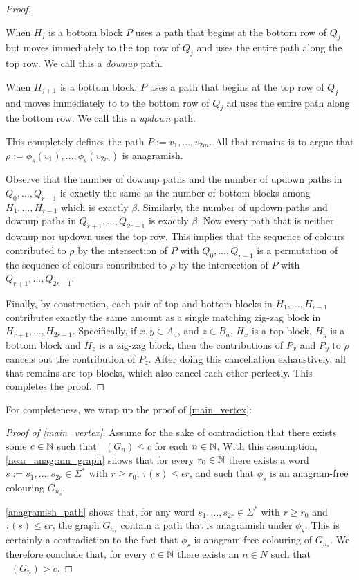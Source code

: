 \documentclass{patmorin}
\DeclareMathOperator{\afcn}{\dot{\chi}_\pi}
\begin{document}
\begin{proof}
    \begin{compactenum}
        \item When $H_j$ is a bottom block $P$ uses a path that begins at the bottom row of $Q_j$ but moves immediately to the top row of $Q_j$ and uses the entire path along the top row. We call this a \emph{downup} path.
        \item When $H_{j+1}$ is a bottom block, $P$ uses a path that begins at the top row of $Q_j$ and moves immediately to to the bottom row of $Q_j$ ad uses the entire path along the bottom row.  We call this a \emph{updown} path.
    \end{compactenum}
    This completely defines the path $P:=v_1,\ldots,v_{2m}$. All that remains is to argue that $\rho:=\phi_s(v_1),\ldots,\phi_s(v_{2m})$ is anagramish.

    Observe that the number of downup paths and the number of updown paths in $Q_0,\ldots,Q_{r-1}$ is exactly the same as the number of bottom blocks among $H_1,\ldots,H_{r-1}$ which is exactly $\beta$.  Similarly, the number of updown paths and downup paths in $Q_{r+1},\ldots,Q_{2r-1}$ is exactly $\beta$.  Now every path that is neither downup nor updown uses the top row.  This implies that the sequence of colours contributed to $\rho$ by  the intersection of $P$ with $Q_0,\ldots,Q_{r-1}$ is a permutation of the sequence of colours contributed to $\rho$ by the intersection of $P$ with $Q_{r+1},\ldots,Q_{2r-1}$.

    Finally, by construction, each pair of top and bottom blocks in $H_1,\ldots,H_{r-1}$ contributes exactly the same amount as a single matching zig-zag block in $H_{r+1},\ldots,H_{2r-1}$.  Specifically, if $x,y\in A_a$, and $z\in B_a$, $H_x$ is a top block, $H_y$ is a bottom block and $H_z$ is a zig-zag block, then the contributions of $P_x$ and $P_y$ to $\rho$ cancels out the contribution of $P_z$. After doing this cancellation exhaustively, all that remains are top blocks, which also cancel each other perfectly.  This completes the proof.
\end{proof}


For completeness, we wrap up the proof of \cref{main_vertex}:

\begin{proof}[Proof of \cref{main_vertex}]
    Assume for the sake of contradiction that there exists some $c\in\mathbb{N}$ such that $\afcn(G_n)\le c$ for each $n\in\mathbb{N}$.  With this assumption, \cref{near_anagram_graph} shows that for every $r_0\in\mathbb{N}$ there exists a word $s:=s_1,\ldots,s_{2r}\in\Sigma^*$ with $r\ge r_0$, $\tau(s)\le\epsilon r$, and such that $\phi_s$ is an anagram-free colouring $G_{n_s}$.

    \cref{anagramish_path} shows that, for any word $s_1,\ldots,s_{2r}\in\Sigma^*$ with $r\ge r_0$ and $\tau(s)\le\epsilon r$, the graph $G_{n_s}$ contain a path that is anagramish under $\phi_s$.  This is certainly a contradiction to the fact that $\phi_s$ is anagram-free colouring of $G_{n_s}$. We therefore conclude that, for every $c\in\mathbb{N}$ there exists an $n\in N$ such that $\afcn(G_n)> c$.
\end{proof}
\end{document}

